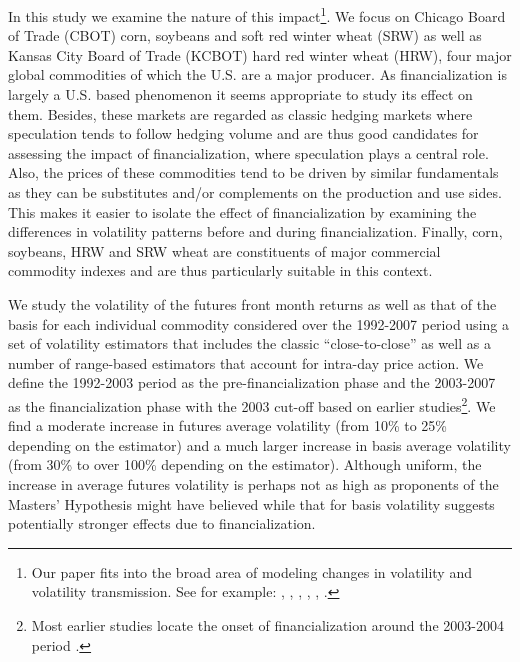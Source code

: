 \documentclass[
]{book}
\let\rmarkdownfootnote\footnote%
\def\footnote{\protect\rmarkdownfootnote}
\begin{document}
In this study we examine the nature of this impact\footnote{Our paper fits into the broad area of modeling changes in volatility and volatility transmission. See for example: \citet{gannon_simultaneous_2010}, \citet{jiang_volatility_2017}, \citet{li_when_2016}, \citet{fung_information_2003}, \citet{smith_forecasting_2003}, \citet{nishina_nonlinear_2012}.}. We focus on Chicago Board of Trade (CBOT) corn, soybeans and soft red winter wheat (SRW) as well as Kansas City Board of Trade (KCBOT) hard red winter wheat (HRW), four major global commodities of which the U.S. are a major producer. As financialization is largely a U.S. based phenomenon it seems appropriate to study its effect on them. Besides, these markets are regarded as classic hedging markets where speculation tends to follow hedging volume \citep{working_hedging_1953, working_whose_1954, working_speculation_1960, working_new_1962, sanders_marginal_2012} and are thus good candidates for assessing the impact of financialization, where speculation plays a central role. Also, the prices of these commodities tend to be driven by similar fundamentals as they can be substitutes and/or complements on the production and use sides. This makes it easier to isolate the effect of financialization by examining the differences in volatility patterns before and during financialization. Finally, corn, soybeans, HRW and SRW wheat are constituents of major commercial commodity indexes and are thus particularly suitable in this context.

We study the volatility of the futures front month returns as well as that of the basis for each individual commodity considered over the 1992-2007 period using a set of volatility estimators that includes the classic ``close-to-close'' as well as a number of range-based estimators that account for intra-day price action. We define the 1992-2003 period as the pre-financialization phase and the 2003-2007 as the financialization phase with the 2003 cut-off based on earlier studies\footnote{Most earlier studies locate the onset of financialization around the 2003-2004 period \citep{basak_model_2016, cheng_financialization_2014, hamilton_effects_2015, irwin_index_2011, irwin_financialization_2012, irwin_testing_2012, tang_index_2012}.}. We find a moderate increase in futures average volatility (from 10\% to 25\% depending on the estimator) and a much larger increase in basis average volatility (from 30\% to over 100\% depending on the estimator). Although uniform, the increase in average futures volatility is perhaps not as high as proponents of the Masters' Hypothesis might have believed while that for basis volatility suggests potentially stronger effects due to financialization.
\end{document}
